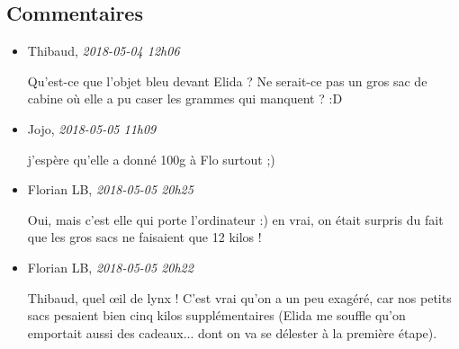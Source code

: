 \hypertarget{commentaires}{%
\subsection{Commentaires}\label{commentaires}}

\begin{itemize}
\item
  Thibaud, \emph{2018-05-04 12h06}

  Qu'est-ce que l'objet bleu devant Elida ? Ne serait-ce pas un gros sac
  de cabine où elle a pu caser les grammes qui manquent ? :D
\item
  Jojo, \emph{2018-05-05 11h09}

  j'espère qu'elle a donné 100g à Flo surtout ;)
\item
  Florian LB, \emph{2018-05-05 20h25}

  Oui, mais c'est elle qui porte l'ordinateur :) en vrai, on était
  surpris du fait que les gros sacs ne faisaient que 12 kilos !
\item
  Florian LB, \emph{2018-05-05 20h22}

  Thibaud, quel œil de lynx ! C'est vrai qu'on a un peu exagéré, car nos
  petits sacs pesaient bien cinq kilos supplémentaires (Elida me souffle
  qu'on emportait aussi des cadeaux... dont on va se délester à la
  première étape).
\end{itemize}
